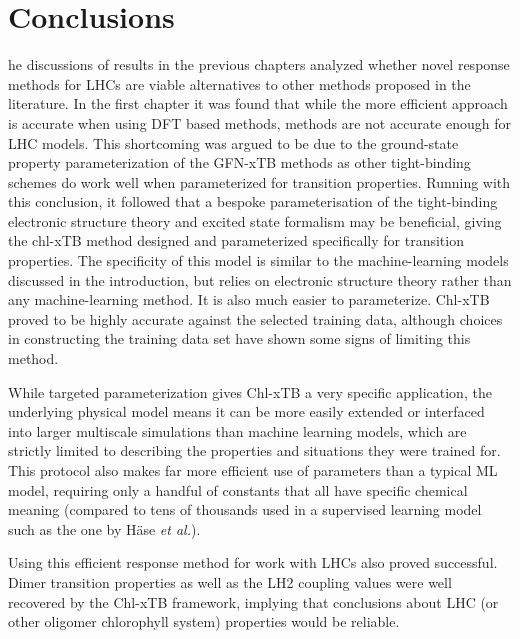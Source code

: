 %
%
\let\textcircled=\pgftextcircled
\chapter{Conclusions}
\label{chap:discussion}

he discussions of results in the previous chapters analyzed whether novel
response methods for LHCs are viable alternatives to other methods proposed in the
literature. In the first chapter it was found that while the more efficient \dscf 
approach is accurate when using DFT based methods, \dxtb methods are not accurate 
enough for LHC models. This shortcoming was argued to be due to the ground-state
property parameterization of the GFN-xTB methods as other tight-binding schemes 
do work well when parameterized for transition properties. Running with this conclusion, 
it followed that a bespoke parameterisation of the tight-binding electronic structure
theory and excited state formalism may be beneficial, giving the chl-xTB method 
designed and parameterized specifically for \Qy transition properties. The specificity
of this model is similar to the machine-learning models discussed in the introduction, 
but relies on electronic structure theory rather than any machine-learning method.
It is also much easier to parameterize. Chl-xTB proved to be highly accurate against 
the selected training data, although choices in constructing the training data set 
have shown some signs of limiting this method.

While targeted parameterization gives Chl-xTB a very specific application, the underlying
physical model means it can be more easily extended or interfaced into larger multiscale
simulations than machine learning models, which are strictly limited to describing 
the properties and situations they were trained for. This protocol also makes far 
more efficient use of parameters than a typical ML model, requiring only a handful 
of constants that all have specific chemical meaning (compared to tens of thousands
used in a supervised learning model such as the one by H\"{a}se \emph{et al.})\cite{AspuruGuzik2016}.

Using this efficient response method for work with LHCs also proved successful. 
Dimer transition properties as well as the LH2 coupling values were well recovered 
by the Chl-xTB framework, implying that conclusions about LHC (or other oligomer
chlorophyll system) properties would be reliable.

